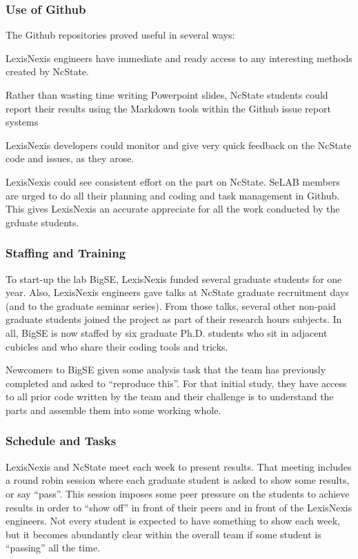 \documentclass{sig-alternate-05-2015}
\newcommand{\bi}{\begin{itemize*}}
\newcommand{\ei}{\end{itemize*}}
\begin{document}
 \subsubsection{Use of Github}
 
The Github repositories proved useful in several  ways:
\bi
\item
 LexisNexis  engineers have immediate and ready access to 
 any interesting methods created by NcState. 
\item
Rather than wasting time writing Powerpoint slides, NcState students could
report their results using the Markdown tools within the Github issue
report systems
\item LexisNexis developers could monitor and give very
quick feedback on the NcState code and issues,
as they arose.
\item
LexisNexis could see consistent effort on the part on NcState. SeLAB members
are urged to do all their planning and coding and task management in Github.
This gives LexisNexis an accurate appreciate for all the work conducted
by the grduate students.

\ei

 \subsubsection{Staffing and Training}
To start-up the lab  BigSE, LexisNexis funded several graduate students for one year. Also,
LexisNexis engineers gave talks at NcState graduate recruitment days (and to
the graduate seminar series). From those talks, several other non-paid graduate students
joined the project as part of their research hours subjects. In all, BigSE is
now staffed by six graduate Ph.D. students who sit in adjacent cubicles and who
 share their coding tools and tricks. 
 

 
Newcomers to BigSE given some analysis task
 that the team has previously completed and asked to ``reproduce this''. For
 that initial study, they have access to all prior code written by the team
 and their challenge is to understand the parts and assemble them into some working
 whole. 
 
 \subsubsection{Schedule and Tasks}
 LexisNexis and NcState meet each week to present results. That meeting includes
a round robin session where each graduate student is asked to show some results,
or say ``pass''. This session imposes some peer pressure on the students to achieve
results in order to ``show off'' in front of their peers and in front of the
LexisNexis engineers. Not every student is expected to have something to show each week,
but it becomes abundantly  clear within the overall team if some student is ``passing'' all
the time.
 
\end{document}
